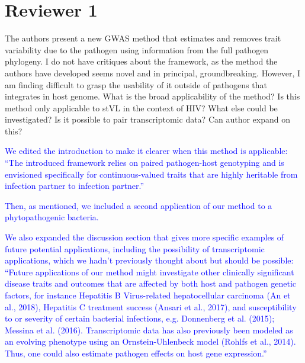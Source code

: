\documentclass[11pt]{article}
\begin{document}
\section*{Reviewer 1}

The authors present a new GWAS method that estimates and removes trait variability due to the pathogen using information from the full pathogen phylogeny. I do not have critiques about the framework, as the method the authors have developed seems novel and in principal, groundbreaking. However, I am finding difficult to grasp the usability of it outside of pathogens that integrates in host genome. What is the broad applicability of the method? Is this method only applicable to stVL in the context of HIV? What else could be investigated? Is it possible to pair transcriptomic data? Can author expand on this?

\vspace{5mm}
\textcolor{blue}{We edited the introduction to make it clearer when this method is applicable: ``The introduced framework relies on paired pathogen-host genotyping and is envisioned specifically for continuous-valued traits that are highly heritable from infection partner to infection partner.''}

\textcolor{blue}{Then, as mentioned, we included a second application of our method to a phytopathogenic bacteria.}

\textcolor{blue}{We also expanded the discussion section that gives more specific examples of future potential applications, including the possibility of transcriptomic applications, which we hadn't previously thought about but should be possible: ``Future applications of our method might investigate other clinically significant disease traits and outcomes that are affected by both host and pathogen genetic factors, for instance Hepatitis B Virus-related hepatocellular carcinoma (An et al., 2018), Hepatitis C treatment success (Ansari et al., 2017), and susceptibility to or severity of certain bacterial infections, e.g. Donnenberg et al. (2015); Messina et al. (2016). Transcriptomic data has also previously been modeled as an evolving phenotype using an Ornstein-Uhlenbeck model (Rohlfs et al., 2014). Thus, one could also estimate pathogen effects on host gene expression.''}
\end{document}
